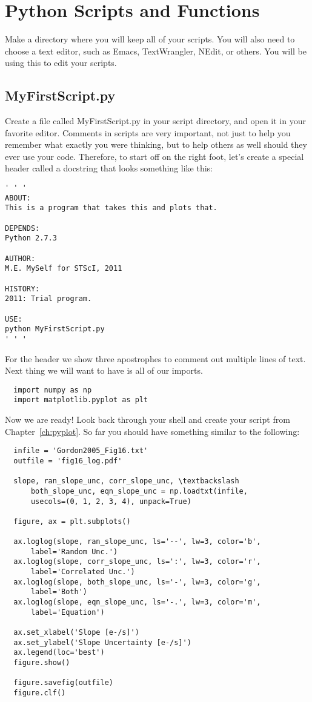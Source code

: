 \chapter{Python Scripts and Functions}
\label{ch:scripts}

Make a directory where you will keep all of your scripts.  You will
also need to choose a text editor, such as Emacs, TextWrangler, NEdit,
or others.  You will be using this to edit your scripts.
 
\section{MyFirstScript.py}

Create a file called MyFirstScript.py in your script directory, and
open it in your favorite editor.  Comments in scripts are very
important, not just to help you remember what exactly you were
thinking, but to help others as well should they ever use your code.
Therefore, to start off on the right foot, let's create a special header 
called a docstring that looks something like this:

\begin{verbatim}
' ' '
ABOUT:
This is a program that takes this and plots that.

DEPENDS:
Python 2.7.3

AUTHOR:
M.E. MySelf for STScI, 2011

HISTORY:
2011: Trial program.

USE:
python MyFirstScript.py
' ' '
\end{verbatim}

For the header we show three apostrophes to comment out multiple lines
of text.  Next thing we will want to have is all of our imports.

\begin{verbatim}
  import numpy as np
  import matplotlib.pyplot as plt 
\end{verbatim}

Now we are ready!  Look back through your shell and create your script
from Chapter~\ref{ch:pyplot}.  So far you should have something similar
to the following:

\begin{verbatim}
  infile = 'Gordon2005_Fig16.txt'
  outfile = 'fig16_log.pdf'
 
  slope, ran_slope_unc, corr_slope_unc, \textbackslash 
      both_slope_unc, eqn_slope_unc = np.loadtxt(infile, 
      usecols=(0, 1, 2, 3, 4), unpack=True) 

  figure, ax = plt.subplots()

  ax.loglog(slope, ran_slope_unc, ls='--', lw=3, color='b', 
      label='Random Unc.')
  ax.loglog(slope, corr_slope_unc, ls=':', lw=3, color='r', 
      label='Correlated Unc.')
  ax.loglog(slope, both_slope_unc, ls='-', lw=3, color='g', 
      label='Both')
  ax.loglog(slope, eqn_slope_unc, ls='-.', lw=3, color='m', 
      label='Equation')

  ax.set_xlabel('Slope [e-/s]')
  ax.set_ylabel('Slope Uncertainty [e-/s]')
  ax.legend(loc='best')
  figure.show()
 
  figure.savefig(outfile)
  figure.clf()
\end{verbatim}

